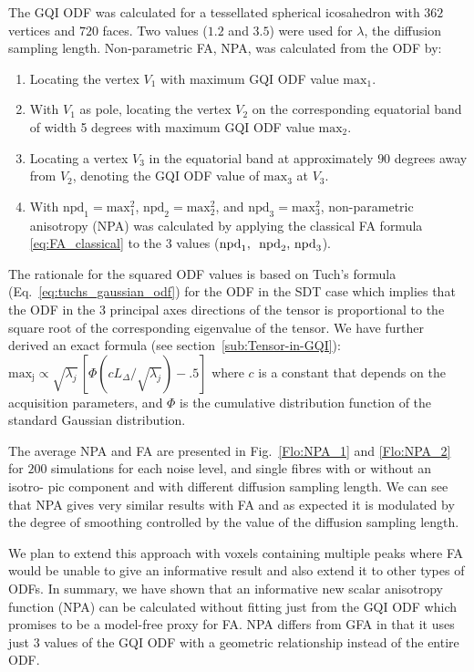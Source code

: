 \documentclass{bioinfo}
\begin{document}
The GQI ODF was calculated for a tessellated spherical icosahedron
with $362$ vertices and $720$ faces. Two values ($1.2$ and $3.5$)
were used for $\lambda$, the diffusion sampling length. Non-parametric
FA, NPA, was calculated from the ODF by: 
\begin{enumerate}
\item Locating the vertex $V_{1}$ with maximum GQI ODF value $\mathrm{max}_{1}$.
\item With $V_{1}$ as pole, locating the vertex $V_{2}$ on the corresponding
equatorial band of width 5 degrees with maximum GQI ODF value
$\textrm{max}_{2}$.
\item Locating a vertex $V_{3}$ in the equatorial band at approximately
$90$ degrees away from $V_{2}$, denoting the GQI ODF value of $\textrm{max}_{3}$
at $V_{3}$. 
\item With $\textrm{npd}_{1}=\textrm{max}_{1}^{2}$, $\textrm{npd}_{2}=\textrm{max}_{2}^{2}$,
and $\textrm{npd}_{3}=\textrm{max}_{3}^{2}$, non-parametric anisotropy
(NPA) was calculated by applying the classical FA formula \ref{eq:FA_classical}
to the 3 values ($\textrm{npd}_{1},\textrm{\,\ npd}_{2},\,\textrm{npd}_{3}$). 
\end{enumerate}
The rationale for the squared ODF values is based on Tuch's formula
(Eq.~\ref{eq:tuchs_gaussian_odf}) for the ODF in the SDT case which
implies that the ODF in the $3$ principal axes directions of the
tensor is proportional to the square root of the corresponding eigenvalue
of the tensor. We have further derived an exact formula (see section~\ref{sub:Tensor-in-GQI}):
$\mathrm{max_{j}}\propto\sqrt{\lambda_{j}}\,[\Phi(cL_{\Delta}/\sqrt{\lambda_{j}})-.5]$
where $c$ is a constant that depends on the acquisition parameters,
and $\Phi$ is the cumulative distribution function of the standard
Gaussian distribution. 

The average NPA and FA are presented in Fig.~\ref{Flo:NPA_1} and
\ref{Flo:NPA_2} for $200$ simulations for each noise level, and
single fibres with or without an isotro- pic component and with different
diffusion sampling length. We can see that NPA gives very similar
results with FA and as expected it is modulated by the degree of smoothing
controlled by the value of the diffusion sampling length. 

We plan to extend this approach with voxels containing multiple peaks
where FA would be unable to give an informative result and also extend
it to other types of ODFs. In summary, we have shown that an informative
new scalar anisotropy function (NPA) can be calculated without fitting
just from the GQI ODF which promises to be a model-free proxy for
FA. NPA differs from GFA \cite{Tuch2004} in that it uses just $3$
values of the GQI ODF with a geometric relationship instead of the
entire ODF. 
\end{document}
